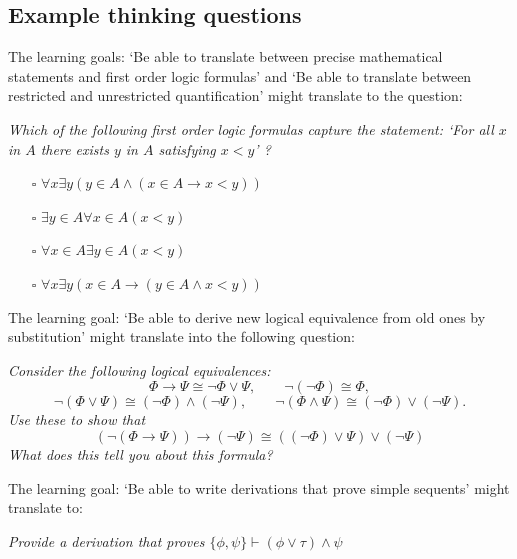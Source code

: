 \documentclass{article}[12pt]
\begin{document}
\subsection{Example thinking questions}
The learning goals: `Be able to translate between precise mathematical statements and first order logic formulas' and `Be able to translate between restricted and unrestricted quantification' might translate to the question:

\emph{Which of the following first order logic formulas capture the statement: `For all $x$ in $A$ there exists $y$ in $A$ satisfying $x < y$' ?}
\begin{itemize}
    \item[$\square$] $ \forall x \exists y (y \in A \wedge (x \in A \rightarrow x < y)) $
    \item[$\square$] $ \exists y \in A \forall x \in A (x < y) $ 
    \item[$\square$] $ \forall x \in A \exists y \in A (x < y) $
    \item[$\square$] $ \forall x \exists y (x \in A \rightarrow (y \in A \wedge x < y)) $
\end{itemize}

The learning goal: `Be able to derive new logical equivalence from old ones by substitution' might translate into the following question:

\emph{Consider the following logical equivalences: 
$$\Phi \rightarrow \Psi \cong \neg \Phi \vee \Psi, \qquad
 \neg (\neg \Phi) \cong \Phi,  $$
 $$\neg (\Phi \vee \Psi) \cong (\neg \Phi) \wedge (\neg \Psi), \qquad \neg (\Phi \wedge \Psi) \cong (\neg \Phi) \vee (\neg \Psi).$$ 
 Use these to show that
$$ (\neg (\Phi \rightarrow \Psi)) \rightarrow (\neg \Psi) \cong ((\neg \Phi) \vee \Psi) \vee (\neg \Psi) $$ 
What does this tell you about this formula?
}

The learning goal: `Be able to write derivations that prove simple sequents' might translate to:

\emph{Provide a derivation that proves $\{ \phi, \psi \} \vdash (\phi \vee \tau) \wedge \psi$}
\end{document}
